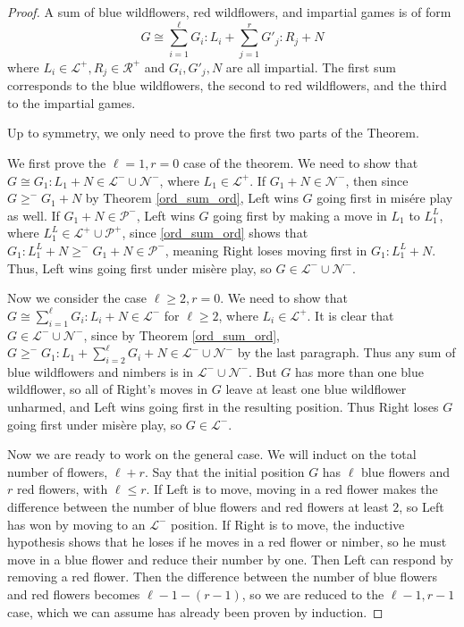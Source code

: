 \documentclass{amsart}
\theoremstyle{plain}
\theoremstyle{definition}
\theoremstyle{remark}
\numberwithin{equation}{section}
\numberwithin{thm}{section}
\begin{document}
\begin{proof}
   A sum of blue wildflowers, red wildflowers, and impartial games is of form \begin{equation}
       G \cong \sum_{i = 1}^{\ell} G_i:L_i + \sum_{j = 1}^r G'_j:R_j +N
   \end{equation}
   where $L_i \in \mathcal{L}^+,R_j \in \mathcal{R}^+$ and $G_i,G'_j,N$ are all impartial. The first sum corresponds to the blue wildflowers, the second to red wildflowers, and the third to the impartial games.

Up to symmetry, we only need to prove the first two parts of the Theorem.

 We first prove the $\ell = 1,r=0$ case of the theorem. We need to show that $G \cong G_1:L_1 + N \in \mathcal{L}^- \cup \mathcal{N}^-$, where $L_1 \in \mathcal{L}^+$. If $G_1 + N\in \mathcal{N}^-$, then since $G \geq^- G_1 + N$ by Theorem \ref{ord_sum_ord}, Left wins $G$ going first in mis\'ere play as well. If $G_1 + N\in \mathcal{P}^-$, Left wins $G$ going first by making a move in $L_1$ to $L_1^L$, where $L_1^L \in \mathcal{L}^+\cup \mathcal{P}^+$, since \ref{ord_sum_ord} shows that $G_1:L_1^L + N\geq^-  G_1+ N  \in \mathcal{P}^-$, meaning Right loses moving first in $G_1:L_1^L +N $. Thus, Left wins going first under mis\`ere play, so $G \in \mathcal{L}^- \cup \mathcal{N}^-$. 
 
   Now we consider the case $\ell \geq 2,r=0$. We need to show that $G \cong  \sum_{i = 1}^\ell G_i:L_i + N \in \mathcal{L}^-$ for $\ell \geq 2$, where $L_i \in \mathcal{L}^+$. It is clear that $G \in \mathcal{L}^- \cup \mathcal{N}^-$, since by Theorem \ref{ord_sum_ord}, $G \geq^- G_1:L_1 + \sum_{i=2}^\ell G_i +N \in \mathcal{L}^- \cup \mathcal{N}^-$ by the last paragraph. Thus any sum of blue wildflowers and nimbers is in $\mathcal{L}^- \cup \mathcal{N}^-$. But $G$ has more than one blue wildflower, so all of Right's moves in $G$ leave at least one blue wildflower unharmed, and Left wins going first in the resulting position. Thus Right loses $G$ going first under mis\`ere play, so $G \in \mathcal{L}^-$.

Now we are ready to work on the general case. We will induct on the total number of flowers, $\ell + r$. Say that the initial position $G$ has $\ell$ blue flowers and $r$ red flowers, with $\ell \leq r$. If Left is to move, moving in a red flower makes the difference between the number of blue flowers and red flowers at least $2$, so Left has won by moving to an $\mathcal{L}^-$ position. If Right is to move, the inductive hypothesis shows that he loses if he moves in a red flower or nimber, so he must move in a blue flower and reduce their number by one. Then Left can respond by removing a red flower. Then the difference between the number of blue flowers and red flowers becomes $\ell - 1 - (r -1)$, so we are reduced to the $\ell-1,r-1$ case, which we can assume has already been proven by induction.
\end{proof}
\end{document}
